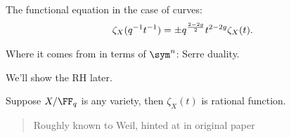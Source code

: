 \begin{theorem}

The functional equation in the case of curves:
\begin{align*}  
\zeta_X(q^{-1} t^{-1} ) = \pm q^{2-2g \over 2} t^{2-2g} \zeta_X(t)
.\end{align*}

\end{theorem}

\begin{exercise}[Important]

Where it comes from in terms of \(\sym^n\): Serre duality.

\end{exercise}

We'll show the RH later.

\begin{theorem}[Dwork]

Suppose \(X/\FF_q\) is any variety, then \(\zeta_X(t)\) is rational
function.

\end{theorem}

\begin{quote}
Roughly known to Weil, hinted at in original paper
\end{quote}

